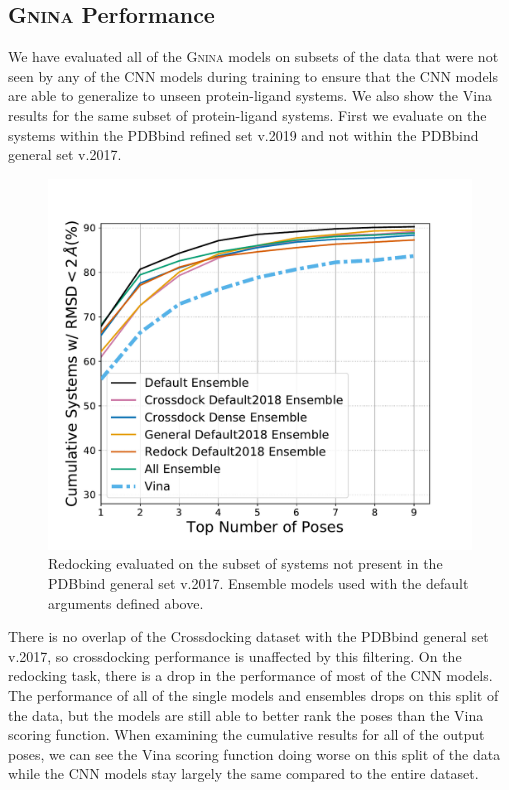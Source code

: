 \documentclass[journal=jcisd8,manuscript=article]{achemso}
\begin{document}
\subsection{\textsc{Gnina} Performance}
We have evaluated all of the \textsc{Gnina} models on subsets of the data that were not seen by any of the CNN models during training to ensure that the CNN models are able to generalize to unseen protein-ligand systems. We also show the Vina results for the same subset of protein-ligand systems. First we evaluate on the systems within the PDBbind refined set v.2019 and not within the PDBbind general set v.2017.
\begin{figure}    
	\centering
	\includegraphics[width=\textwidth]{figures/redocking/ensemble_models_no2017_line.pdf}
	\caption{Redocking evaluated on the subset of systems not present in the PDBbind general set v.2017. Ensemble models used with the default arguments defined above.}
	\label{fig:No2017}
\end{figure}
There is no overlap of the Crossdocking dataset with the PDBbind general set v.2017, so crossdocking performance is unaffected by this filtering. On the redocking task, there is a drop in the performance of most of the CNN models. The performance of all of the single models and ensembles drops on this split of the data, but the models are still able to better rank the poses than the Vina scoring function. When examining the cumulative results for all of the output poses, we can see the Vina scoring function doing worse on this split of the data while the CNN models stay largely the same compared to the entire dataset.
\end{document}
